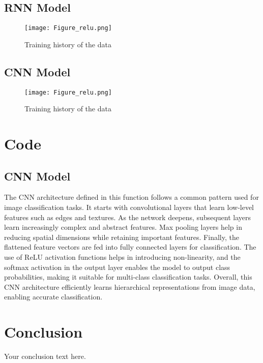 \documentclass{article}
\begin{document}
\subsection{RNN Model}

\begin{figure}[h]
\caption{Training history of the data}
\centering
\texttt{[image: Figure\_relu.png]}
\end{figure}

\subsection{CNN Model}

\begin{figure}[h]
\caption{Training history of the data}
\centering
\texttt{[image: Figure\_relu.png]}
\end{figure}
\newpage

\section{Code}
\subsection{CNN Model}
    The CNN architecture defined in this function follows a common pattern used for image classification tasks.
    It starts with convolutional layers that learn low-level features such as edges and textures.
    As the network deepens, subsequent layers learn increasingly complex and abstract features.
    Max pooling layers help in reducing spatial dimensions while retaining important features.
    Finally, the flattened feature vectors are fed into fully connected layers for classification.
    The use of ReLU activation functions helps in introducing non-linearity,
    and the softmax activation in the output layer enables the model to output class probabilities,
    making it suitable for multi-class classification tasks.
    Overall, this CNN architecture efficiently learns hierarchical representations from image data,
    enabling accurate classification.

\section{Conclusion}
Your conclusion text here.
\end{document}
